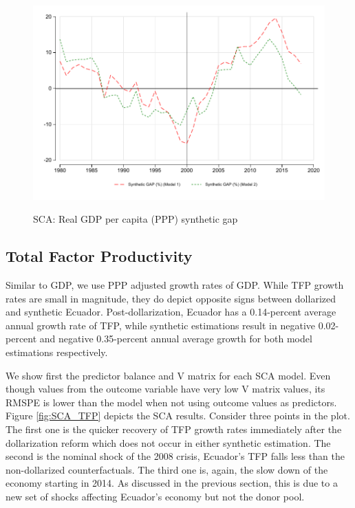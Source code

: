 \documentclass[12pt]{article}
\begin{document}
\begin{figure}[!h]
    \caption{SCA: Real GDP per capita (PPP) synthetic gap}
    \centering
    \includegraphics{STATA/Fig_GDP_GAP.pdf}
    \label{fig:SCA_gap}
\end{figure}

\subsection{Total Factor Productivity}

Similar to GDP, we use PPP adjusted growth rates of GDP. While TFP growth rates are small in magnitude, they do depict opposite signs between dollarized and synthetic Ecuador. Post-dollarization, Ecuador has a 0.14-percent average annual growth rate of TFP, while synthetic estimations result in  negative 0.02-percent and negative 0.35-percent annual average growth for both model estimations respectively. 

We show first the predictor balance and V matrix for each SCA model. Even though values from the outcome variable have very low V matrix values, its RMSPE is lower than the model when not using outcome values as predictors. Figure \ref{fig:SCA_TFP} depicts the SCA results. Consider three points in the plot. The first one is the quicker recovery of TFP growth rates immediately after the dollarization reform which does not occur in either synthetic estimation. The second is the nominal shock of the 2008 crisis, Ecuador's TFP falls less than the non-dollarized counterfactuals. The third one is, again, the slow down of the economy starting in 2014. As discussed in the previous section, this is due to a new set of shocks affecting Ecuador's economy but not the donor pool.
\end{document}
